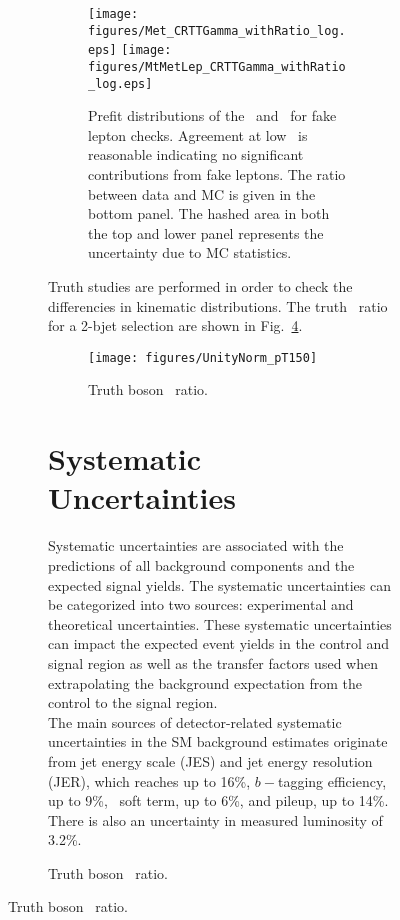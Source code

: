 \begin{figure}[htbp]
\begin{center}
\begin{figure}[htbp]
\begin{center}
{{{\begin{figure}[htbp]
\begin{center}
\texttt{[image: figures/Met\_CRTTGamma\_withRatio\_log.eps]}
\texttt{[image: figures/MtMetLep\_CRTTGamma\_withRatio\_log.eps]}
\caption{\label{fig:ttVFakeLepCheck} Prefit distributions of the \met\ and \mtlepmet\ for fake lepton checks. Agreement at low \mtlepmet\ is reasonable indicating no significant contributions from fake leptons. The ratio between data and MC is given in the bottom panel. The hashed area in both the top and lower panel represents the uncertainty due to MC statistics.}
\end{center}
\end{figure}

Truth studies are performed in order to check the differencies in
kinematic distributions. The truth \pT\ ratio for a 2-bjet
selection are shown in Fig.~\ref{fig:ttZ_vs_ttGamma_pt}.

\begin{figure}[htpb]
\centering
\texttt{[image: figures/UnityNorm\_pT150]}
\caption{Truth boson \pT\ ratio.}
\label{fig:ttZ_vs_ttGamma_pt}
\end{figure}


\section{Systematic Uncertainties}

Systematic uncertainties are associated with the predictions of all background components and the expected signal yields. The systematic uncertainties can be categorized into two sources: experimental and theoretical uncertainties. These systematic uncertainties can impact the expected event yields in the control and signal region as well as the transfer factors used when extrapolating the background expectation from the control to the signal region. \\

The main sources of detector-related systematic uncertainties in the SM background estimates originate from jet energy scale (JES) and jet energy resolution (JER), which reaches up to 16\%, $b-$tagging efficiency, up to 9\%, \met\ soft term, up to 6\%, and pileup, up to 14\%.  There is also an uncertainty in measured luminosity of 3.2\%.

}}}
\end{center}
\end{figure}
\end{center}
\end{figure}
